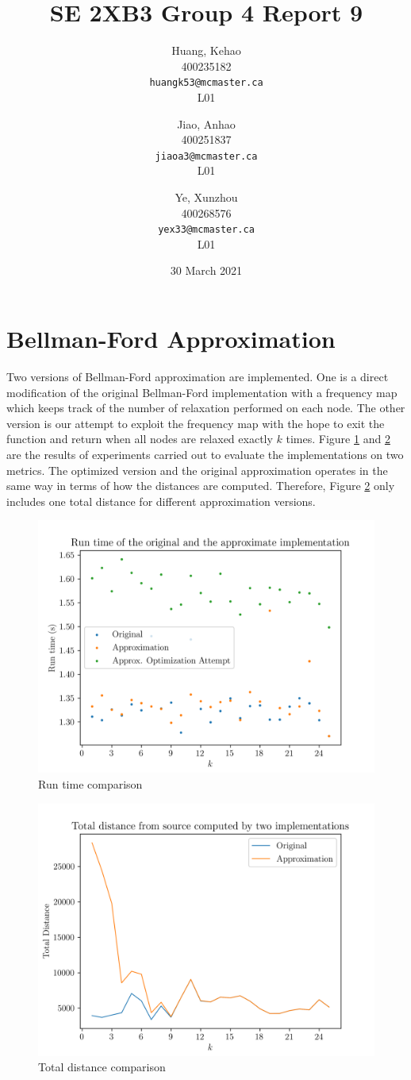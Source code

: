 \documentclass[titlepage, 12pt]{article}
\title{SE 2XB3 Group 4 Report 9}
\author{
  Huang, Kehao \\
  400235182 \\
  \texttt{huangk53@mcmaster.ca} \\
  L01
  \and
  Jiao, Anhao \\
  400251837 \\
  \texttt{jiaoa3@mcmaster.ca} \\
  L01
  \and
  Ye, Xunzhou \\
  400268576 \\
  \texttt{yex33@mcmaster.ca} \\
  L01
}
\date{30 March 2021}
\begin{document}
\maketitle{}

\newpage{}

\section{Bellman-Ford Approximation}

Two versions of Bellman-Ford approximation are implemented. One is a direct
modification of the original Bellman-Ford implementation with a frequency map
which keeps track of the number of relaxation performed on each node. The other
version is our attempt to exploit the frequency map with the hope to exit the
function and return when all nodes are relaxed exactly \(k\) times. Figure
\ref{fig:rtcomp} and \ref{fig:tdcomp} are the results of experiments carried out
to evaluate the implementations on two metrics. The optimized version and the
original approximation operates in the same way in terms of how the distances
are computed. Therefore, Figure \ref{fig:tdcomp} only includes one total
distance for different approximation versions.
\begin{figure}[h]
  \centering
  \includegraphics[width=0.8\linewidth]{rtcomp} 
  \caption{Run time comparison}
  \label{fig:rtcomp}
\end{figure}
\begin{figure}[h]
  \centering
  \includegraphics[width=0.8\linewidth]{tdcomp} 
  \caption{Total distance comparison}
  \label{fig:tdcomp}
\end{figure}
\end{document}
